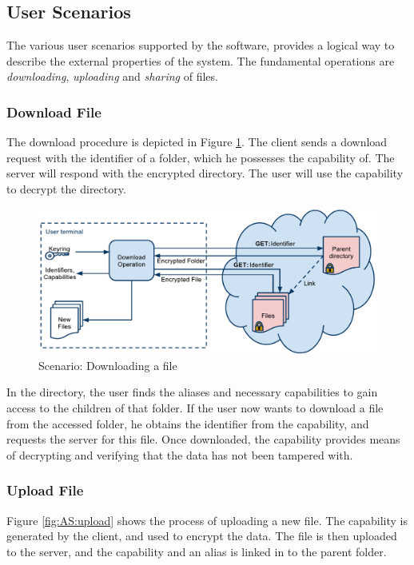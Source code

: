 \documentclass[pdftex,english,10pt,b5paper,twoside]{book}
\begin{document}
\subsection{User Scenarios}

The various user scenarios supported by the software, provides a logical way to
describe the external properties of the system. The fundamental operations are
\emph{downloading}, \emph{uploading} and \emph{sharing} of files.

\subsubsection{Download File}

The download procedure is depicted in Figure \ref{fig:AS:download}. The client
sends a download request with the identifier of a folder, which he possesses
the capability of. The server will respond with the encrypted directory.
The user will use the capability to decrypt the directory.

\begin{figure}[h!]
    \centering
    \includegraphics[width=\columnwidth]{ArchitectureDownload.pdf}
    \caption{Scenario: Downloading a file}
    \label{fig:AS:download}
\end{figure}

In the directory, the user finds the aliases and necessary capabilities to gain
access to the children of that folder. If the user now wants to download a file
from the accessed folder, he obtains the identifier from the capability, and
requests the server for this file. Once downloaded, the capability provides
means of decrypting and verifying that the data has not been tampered with.

\subsubsection{Upload File}

Figure \ref{fig:AS:upload} shows the process of uploading a new file. The
capability is generated by the client, and used to encrypt the data. The file
is then uploaded to the server, and the capability and an alias is linked in to
the parent folder.
\end{document}
